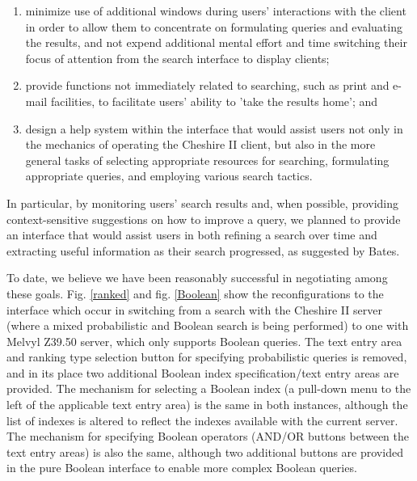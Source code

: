 \begin{enumerate}

\item minimize use of additional windows during users' interactions
with the client in order to allow them to concentrate on formulating
queries and evaluating the results, and not expend additional mental
effort and time switching their focus of attention from the search
interface to display clients;

\item provide functions not immediately related to searching,
such as print and e-mail facilities, to facilitate users' ability to
'take the results home'; and

\item design a help system within the interface that would assist
users not only in the mechanics of operating the Cheshire II client,
but also in the more general tasks of selecting appropriate resources
for searching, formulating appropriate queries, and employing various
search tactics.

\end{enumerate}

In particular, by monitoring users' search results and, when possible,
providing context-sensitive suggestions on how to improve a query, we
planned to provide an interface that would assist users in both
refining a search over time and extracting useful information as their
search progressed, as suggested by Bates\cite{BATES}.

To date, we believe we have been reasonably successful in negotiating
among these goals.  Fig. \ref{ranked} and fig. \ref{Boolean} show the
reconfigurations to the interface which occur in switching from a
search with the Cheshire II server (where a mixed probabilistic and
Boolean search is being performed) to one with Melvyl Z39.50 server,
which only supports Boolean queries.\footnotemark{} The text
entry area and ranking type selection button for specifying
probabilistic queries is removed, and in its place two additional
Boolean index specification/text entry areas are provided.  The
mechanism for selecting a Boolean index (a pull-down menu to the left
of the applicable text entry area) is the same in both instances,
although the list of indexes is altered to reflect the indexes
available with the current server.  The mechanism for specifying
Boolean operators (AND/OR buttons between the text entry areas) is
also the same, although two additional buttons are provided in the
pure Boolean interface to enable more complex Boolean queries.  

